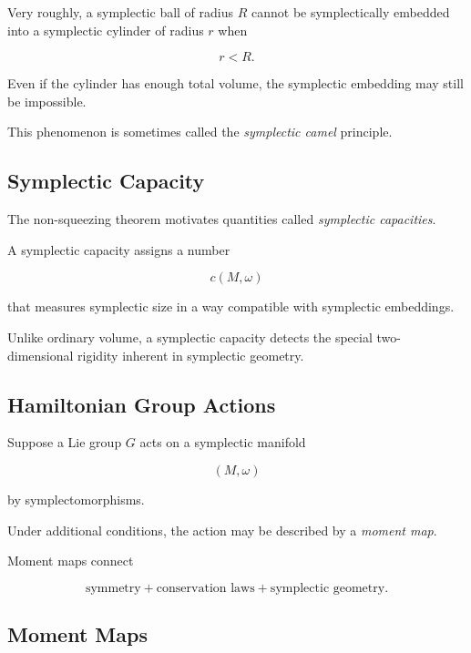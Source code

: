 Very roughly, a symplectic ball of radius \(R\) cannot be symplectically
embedded into a symplectic cylinder of radius \(r\) when

\[
\boxed{
r<R.
}
\]

Even if the cylinder has enough total volume, the symplectic embedding may
still be impossible.

This phenomenon is sometimes called the \emph{symplectic camel} principle.

\subsection{Symplectic Capacity}
\label{subsec:symplectic-capacity}

The non-squeezing theorem motivates quantities called
\emph{symplectic capacities}.

A symplectic capacity assigns a number

\[
c(M,\omega)
\]

that measures symplectic size in a way compatible with symplectic
embeddings.

Unlike ordinary volume, a symplectic capacity detects the special
two-dimensional rigidity inherent in symplectic geometry.

\subsection{Hamiltonian Group Actions}
\label{subsec:hamiltonian-group-actions}

Suppose a Lie group \(G\) acts on a symplectic manifold

\[
(M,\omega)
\]

by symplectomorphisms.

Under additional conditions, the action may be described by a
\emph{moment map}.

Moment maps connect

\[
\boxed{
\text{symmetry}
+
\text{conservation laws}
+
\text{symplectic geometry}.
}
\]

\subsection{Moment Maps}
\label{subsec:moment-maps}

